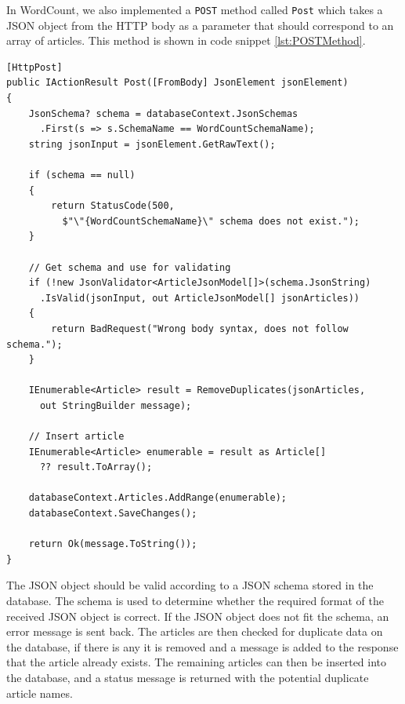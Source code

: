 In WordCount, we also implemented a \texttt{POST} method called \texttt{Post} which takes a JSON object from the HTTP body as a parameter that should correspond to an array of articles. 
This method is shown in code snippet \ref{lst:POSTMethod}.

\begin{lstlisting}[language=CSharp, caption={The \texttt{POST} method.}, label={lst:POSTMethod}]
[HttpPost]
public IActionResult Post([FromBody] JsonElement jsonElement)
{
    JsonSchema? schema = databaseContext.JsonSchemas
      .First(s => s.SchemaName == WordCountSchemaName);
    string jsonInput = jsonElement.GetRawText();

    if (schema == null)
    {
        return StatusCode(500, 
          $"\"{WordCountSchemaName}\" schema does not exist.");
    }

    // Get schema and use for validating
    if (!new JsonValidator<ArticleJsonModel[]>(schema.JsonString)
      .IsValid(jsonInput, out ArticleJsonModel[] jsonArticles))
    {
        return BadRequest("Wrong body syntax, does not follow schema.");
    }

    IEnumerable<Article> result = RemoveDuplicates(jsonArticles,
      out StringBuilder message);

    // Insert article
    IEnumerable<Article> enumerable = result as Article[] 
      ?? result.ToArray();

    databaseContext.Articles.AddRange(enumerable);
    databaseContext.SaveChanges();

    return Ok(message.ToString());
}
\end{lstlisting}

The JSON object should be valid according to a JSON schema stored in the database. The schema is used to determine whether the required format of the received JSON object is correct. If the JSON object does not fit the schema, an error message is sent back. 
The articles are then checked for duplicate data on the database, if there is any it is removed and a message is added to the response that the article already exists. The remaining articles can then be inserted into the database, and a status message is returned with the potential duplicate article names. 
 
